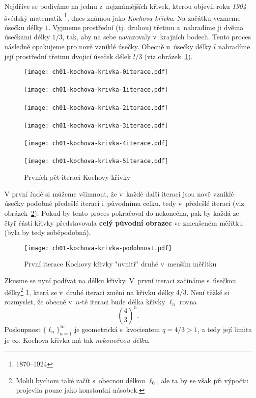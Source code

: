 Nejdříve se podíváme na jednu z~nejznámějších křivek, kterou objevil roku \emph{1904} švédský matematik \footnote{1870--1924}, dnes známou jako \emph{Kochova křivka}. \citep[str. 61]{Peitgen2004} Na začátku vezmeme úsečku délky $1$. Vyjmeme prostřední (tj. druhou) třetinu a~nahradíme ji dvěma úsečkami délky $1/3$, tak, aby na sebe navazovaly v~krajních bodech. Tento proces následně opakujeme pro nově vzniklé úsečky. Obecně u~úsečky délky $l$ nahradíme její prostřední třetinu dvojicí úseček délek $l/3$ (viz obrázek~\ref{fig:kochova_vlocka_5iteraci}).
\begin{figure}[h]
    \centering
    \texttt{[image: ch01-kochova-krivka-0iterace.pdf]}\\\qquad\\
    \texttt{[image: ch01-kochova-krivka-1iterace.pdf]}\\\qquad\\
    \texttt{[image: ch01-kochova-krivka-2iterace.pdf]}\\\qquad\\
    \texttt{[image: ch01-kochova-krivka-3iterace.pdf]}\\\qquad\\
    \texttt{[image: ch01-kochova-krivka-4iterace.pdf]}\\\qquad\\
    \texttt{[image: ch01-kochova-krivka-5iterace.pdf]}
    \caption{Prvních pět iterací Kochovy křivky}
    \label{fig:kochova_vlocka_5iteraci}
\end{figure}
V první řadě si můžeme všimnout, že v~každé další iteraci jsou nově vzniklé úsečky podobné předešlé iteraci i~původnímu celku, tedy v~předešlé iteraci (viz obrázek~\ref{fig:kochova_krivka_podobnost}). Pokud by tento proces pokračoval do nekonečna, pak by každá ze čtyř částí křivky představovala \textbf{celý původní obrazec} ve zmenšeném měřítku (byla by tedy soběpodobná).
\begin{figure}[h]
    \centering
    \texttt{[image: ch01-kochova-krivka-podobnost.pdf]}
    \caption{První iterace Kochovy křivky "uvnitř" druhé v~menším měřítku}
    \label{fig:kochova_krivka_podobnost}
\end{figure}
Zkusme se nyní podívat na délku křivky. V~první iteraci začínáme s~úsečkou délky\footnote{Mohli bychom také začít s~obecnou délkou $\ell_0$, ale ta by se však při výpočtu projevila pouze jako konstantní násobek.} $1$, která se v~druhé iteraci změní na křivku délky $4/3$. Není těžké si rozmyslet, že obecně v~$n$-té iteraci bude délka křivky $\ell_n$ rovna
\begin{equation*}
    \left(\dfrac{4}{3}\right)^{n}.
\end{equation*}
Posloupnost $\{\ell_n\}_{n=1}^{\infty}$ je geometrická s~kvocientem $q=4/3>1$, a tedy její limita je $\infty$. Kochova křivka má tak \emph{nekonečnou délku}.

